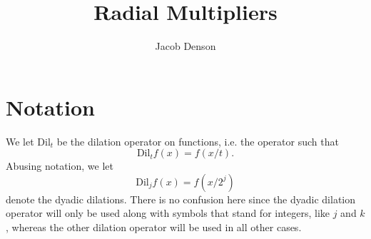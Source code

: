     

\title{Radial Multipliers}
\author{Jacob Denson}



\maketitle

\tableofcontents

\newpage

\chapter{Notation}

We let $\text{Dil}_t$ be the dilation operator on functions, i.e. the operator such that
%
\[ \text{Dil}_t f(x) = f(x/t). \]
%
Abusing notation, we let
%
\[ \text{Dil}_j f(x) = f(x/2^j) \]
%
denote the dyadic dilations. There is no confusion here since the dyadic dilation operator will only be used along with symbols that stand for integers, like $j$ and $k$, whereas the other dilation operator will be used in all other cases.

%


    

